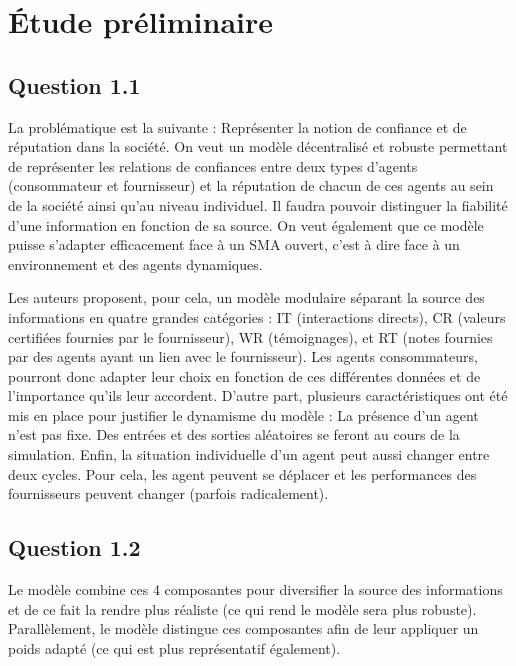 \section{Étude préliminaire}
\subsection{Question 1.1}
 La problématique est la suivante : Représenter la notion de confiance et de réputation dans la société. On veut un modèle décentralisé et robuste permettant de représenter les relations de confiances entre deux types d’agents (consommateur et fournisseur) et la réputation de chacun de ces agents au sein de la société ainsi qu’au niveau individuel. Il faudra pouvoir distinguer la fiabilité d’une information en fonction de sa source. On veut également que ce modèle puisse s’adapter efficacement face à un SMA ouvert, c’est à dire face à un environnement et des agents dynamiques. 

Les auteurs proposent, pour cela, un modèle modulaire séparant la source des informations en quatre grandes catégories : IT (interactions directs), CR (valeurs certifiées fournies par le fournisseur), WR (témoignages), et RT (notes fournies par des agents ayant un lien avec le fournisseur). Les agents consommateurs, pourront donc adapter leur choix en fonction de ces différentes données et de l'importance qu'ils leur accordent.
D'autre part, plusieurs caractéristiques ont été mis en place pour justifier le dynamisme du modèle : La présence d’un agent n’est pas fixe. Des entrées et des sorties aléatoires se feront au cours de la simulation. Enfin, la situation individuelle d’un agent peut aussi changer entre deux cycles. Pour cela, les agent peuvent se déplacer et les performances des fournisseurs peuvent changer (parfois radicalement).

\subsection{Question 1.2}
Le modèle combine ces 4 composantes pour diversifier la source des informations et de ce fait la rendre plus réaliste (ce qui rend le modèle sera plus robuste). Parallèlement, le modèle distingue ces composantes afin de leur appliquer un poids adapté (ce qui est plus représentatif également).
